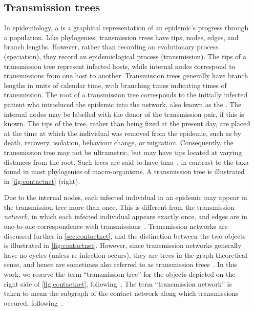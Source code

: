 \subsection{Transmission trees}

In epidemiology, a  is a graphical representation of an
epidemic's progress through a population. Like phylogenies, transmission trees
have tips, nodes, edges, and branch lengths. However, rather than recording an
evolutionary process (speciation), they record an epidemiological process
(transmission). The tips of a transmission tree represent infected hosts, while
internal nodes correspond to transmissions from one host to another.
Transmission trees generally have branch lengths in units of calendar time,
with branching times indicating times of transmission. The root of a
transmission tree corresponds to the initially infected patient who introduced
the epidemic into the network, also known as the . The
internal nodes may be labelled with the donor of the transmission pair, if this
is known. The tips of the tree, rather than being fixed at the present day, are
placed at the time at which the individual was removed from the epidemic, such
as by death, recovery, isolation, behaviour change, or migration. Consequently,
the transmission tree may not be ultrametric, but may have tips located at
varying distances from the root. Such trees are said to have
 taxa~\autocite{drummond2003measurably}, in contrast to
the  taxa found in most phylogenies of macro-organisms. A
transmission tree is illustrated in \cref{fig:contactnet} (right). 

Due to the internal nodes, each infected individual in an epidemic may appear
in the transmission tree more than once. This is different from the
transmission \emph{network}, in which each infected individual appears exactly
once, and edges are in one-to-one correspondence with
transmissions~\autocite{welch2011statistical, keeling2005networks}.
Transmission networks are discussed further in \cref{sec:contactnet}, and the
distinction between the two objects is illustrated in \cref{fig:contactnet}.
However, since transmission networks generally have no cycles (unless
re-infection occurs), they are trees in the graph theoretical sense, and hence
are sometimes also referred to as transmission
trees~\autocite[\eg][]{kenah2015algorithms}. In this work, we reserve the term
``transmission tree'' for the objects depicted on the right side of
\cref{fig:contactnet}, following~\autocite[\eg][]{stadler2013uncovering}. The
term ``transmission network'' is taken to mean the subgraph of the contact
network along which transmissions occured,
following~\autocite{welch2011statistical, keeling2005networks}.

